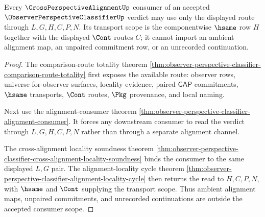 \begin{theorem}
\label{thm:observer-perspective-classifier-alignment-transport-scope}
Every $\CrossPerspectiveAlignmentUp$ consumer of an accepted $\ObserverPerspectiveClassifierUp$ verdict may use only the displayed route through $L,G,H,C,P,N$. Its transport scope is the componentwise $\hsame$ row $H$ together with the displayed $\Cont$ routes $C$; it cannot import an ambient alignment map, an unpaired commitment row, or an unrecorded continuation.
\end{theorem}
\begin{proof}
The comparison-route totality theorem \autoref{thm:observer-perspective-classifier-comparison-route-totality} first exposes the available route: observer rows, universe-for-observer surfaces, locality evidence, paired $\mathsf{GAP}$ commitments, $\hsame$ transports, $\Cont$ routes, $\Pkg$ provenance, and local naming.

Next use the alignment-consumer theorem \autoref{thm:observer-perspective-classifier-alignment-consumer}. It forces any downstream consumer to read the verdict through $L,G,H,C,P,N$ rather than through a separate alignment channel.

The cross-alignment locality soundness theorem \autoref{thm:observer-perspective-classifier-cross-alignment-locality-soundness} binds the consumer to the same displayed $L,G$ pair. The alignment-locality cycle theorem \autoref{thm:observer-perspective-classifier-alignment-locality-cycle} then returns the read to $H,C,P,N$, with $\hsame$ and $\Cont$ supplying the transport scope. Thus ambient alignment maps, unpaired commitments, and unrecorded continuations are outside the accepted consumer scope.
\end{proof}

